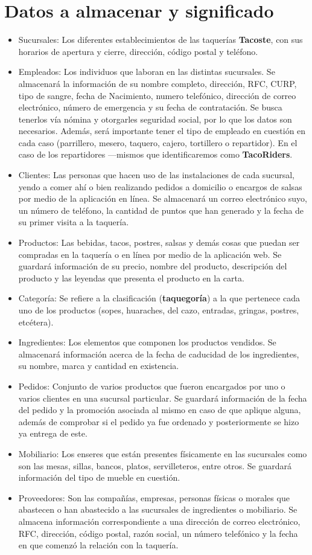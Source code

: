 \documentclass[11pt,letterpaper]{article}
\begin{document}
\section{Datos a almacenar y significado}

\begin{itemize}
\item Sucursales: Los diferentes establecimientos de las taquerías \textbf{Tacoste}, con sus horarios de apertura y cierre, dirección, código postal y teléfono.
\item Empleados: Los individuos que laboran en las distintas sucursales. Se almacenará la información de su nombre completo, dirección, RFC, CURP, tipo de sangre, fecha de Nacimiento, numero telefónico, dirección de correo electrónico, número de emergencia y su fecha de contratación. Se busca tenerlos vía nómina y otorgarles seguridad social, por lo que los datos son necesarios. Además, será importante tener el tipo de empleado en cuestión en cada caso (parrillero, mesero, taquero, cajero, tortillero o repartidor). En el caso de los repartidores ---mismos que identificaremos como \textbf{TacoRiders}.
\item Clientes: Las personas que hacen uso de las instalaciones de cada sucursal, yendo a comer ahí o bien realizando pedidos a domicilio o encargos de salsas por medio de la aplicación en línea. Se almacenará un correo electrónico suyo, un número de teléfono, la cantidad de puntos que han generado y la fecha de su primer visita a la taquería.
\item Productos: Las bebidas, tacos, postres, salsas y demás cosas que puedan ser compradas en la taquería o en línea por medio de la aplicación web. Se guardará información de su precio, nombre del producto, descripción del producto y las leyendas que presenta el producto en la carta.
\item Categoría: Se refiere a la clasificación (\textbf{taquegoría}) a la que pertenece cada uno de los productos (sopes, huaraches, del cazo, entradas, gringas, postres, etcétera). 
\item Ingredientes: Los elementos que componen los productos vendidos. Se almacenará información acerca de la fecha de caducidad de los ingredientes, su nombre, marca y cantidad en existencia.
\item Pedidos: Conjunto de varios productos que fueron encargados por uno o varios clientes en una sucursal particular. Se guardará información de la fecha del pedido y la promoción asociada al mismo en caso de que aplique alguna, además de comprobar si el pedido ya fue ordenado y posteriormente se hizo ya entrega de este.
\item Mobiliario: Los enseres que están presentes físicamente en las sucursales como son las mesas, sillas, bancos, platos, servilleteros, entre otros. Se guardará información del tipo de mueble en cuestión.
\item Proveedores: Son las compañías, empresas, personas físicas o morales que abastecen o han abastecido a las sucursales de ingredientes o mobiliario. Se almacena información correspondiente a una dirección de correo electrónico, RFC, dirección, código postal, razón social, un número telefónico y la fecha en que comenzó la relación con la taquería.
\end{itemize}
\end{document}
